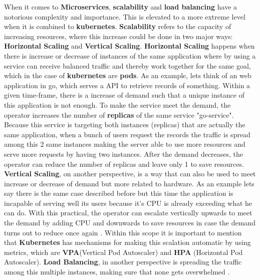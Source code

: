 When it comes to \textbf{Microservices}, \textbf{scalability}  and \textbf{load balancing} have a notorious complexity and importance. This is elevated to a more extreme level when it is combined to \textbf{kubernetes}. \textbf{Scalability} refers to the capacity of increasing resources, where this increase could be done in two major ways: \textbf{Horizontal Scaling} and \textbf{Vertical Scaling}. \textbf{Horizontal Scaling} happens when there is increase or decrease of instances of the same application where by using a service can receive balanced traffic and thereby work together for the same goal, which in the case of \textbf{kubernetes} are \textbf{pods}. As an example, lets think of an web application in go, which serves a API to retrieve records of something. Within a given time-frame, there is a increase of demand such that a unique instance of this application is not enough. To make the service meet the demand, the operator increases the number of \textbf{replicas} of the same service "go-service". Because this service is targeting both instances (replicas) that are actually the same application, when a bunch of users request the records the traffic is spread among this 2 same instances making the server able to use more resources and serve more requests by having two instances. After the demand decreases, the operator can reduce the number of replicas and leave only 1 to save resources. \textbf{Vertical Scaling}, on another perspective, is a way that can also be used to meet increase or decrease of demand but more related to hardware. As an example lets say there is the same case described before but this time the application is incapable of serving well its users because it's CPU is already exceeding what he can do. With this practical, the operator can escalate vertically upwards to meet the demand by adding CPU and downwards to save resources in case the demand turns out to reduce once again \cite{vertical-scaling}\cite{horizontal-autoscaling}\cite{scaling-vertical-and-horizontal}. Within this scope it is important to mention that \textbf{Kubernetes} has mechanisms for making this scalation automatic by using metrics, which are \textbf{VPA}(Vertical Pod Autoscaler) and \textbf{HPA} (Horizontal Pod Autoscaler). \textbf{Load Balancing}, in another perspective is spreading the traffic among this multiple instances, making sure that none gets overwhelmed \cite{load-balancing}.

